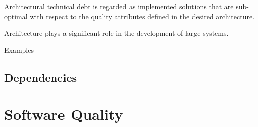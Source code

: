 Architectural technical debt is regarded as implemented solutions that are sub-optimal with respect to the quality attributes defined in the desired architecture. 

Architecture plays a significant role in the development of large systems\cite{krutchen}.

Examples

\subsection{Dependencies}















\section{Software Quality}






